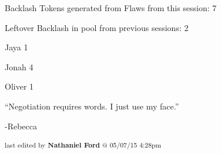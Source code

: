 Backlash Tokens generated from Flaws from this session: 7

Leftover Backlash in pool from previous sessions: 2


Jaya 1

Jonah 4

Oliver 1



``Negotiation requires words.  I just use my face.''

        -Rebecca


\iffalse

======================
THESE ARE ERRORS ENCOUNTERED DURING THE EXPORT PROCESS
======================

	Unable to understand footnote +1, too many options & none that matched \footnote{\textbf{q.google } \textsubscript{04/06/13 3:24pm}}. Optional comment markups: \footnote{$\rightarrow$\textbf{Adam Kenney }+1 \textsubscript{04/08/13 7:23pm}}\footnote{$\rightarrow$\textbf{Suko T }+1 \textsubscript{04/06/13 4:42pm}}\footnote{$\rightarrow$\textbf{Nathaniel Ford }+1 \textsubscript{04/07/13 1:31am}}\footnote{$\rightarrow$\textbf{Nathaniel Ford }+1 \textsubscript{05/26/14 11:05pm}} 

	Unable to understand footnote +1, too many options & none that matched \footnote{\textbf{q.google }What he thinks: "Are you fucking _kidding_?"

What he would have thought if he had more time (and less pain): "There must be something else to this.  They _know_ Hayley will always follow orders.  What's the catch?"

What he should have thought: "Oh @$%


\fi

\vspace{\fill}

\begin{flushright}
\textsubscript{last edited by \textbf{Nathaniel Ford} @ 05/07/15 4:28pm}
\end{flushright}

